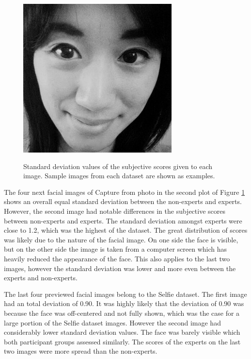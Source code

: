 \begin{figure}[H]
    \subfloat
        {\includegraphics[scale = 0.1]{figures/271.jpg}\hspace{1cm}}
    \quad
     \caption{Standard deviation values of the subjective scores given to each image. Sample images from each dataset are shown as examples.}
     \label{fig:MobaiDS}
\end{figure}

The four next facial images of Capture from photo in the second plot of Figure \ref{fig:MobaiDS} shows an overall equal standard deviation between the non-experts and experts. However, the second image had notable differences in the subjective scores between non-experts and experts. The standard deviation amongst experts were close to 1.2, which was the highest of the dataset. The great distribution of scores was likely due to the nature of the facial image. On one side the face is visible, but on the other side the image is taken from a computer screen which has heavily reduced the appearance of the face. This also applies to the last two images, however the standard deviation was lower and more even between the experts and non-experts.

The last four previewed facial images belong to the Selfie dataset. The first image had an total deviation of 0.90. It was highly likely that the deviation of 0.90 was because the face was off-centered and not fully shown, which was the case for a large portion of the Selfie dataset images. However the second image had considerably lower standard deviation values. The face was barely visible which both participant groups assessed similarly. The scores of the experts on the last two images were more spread than the non-experts. 


